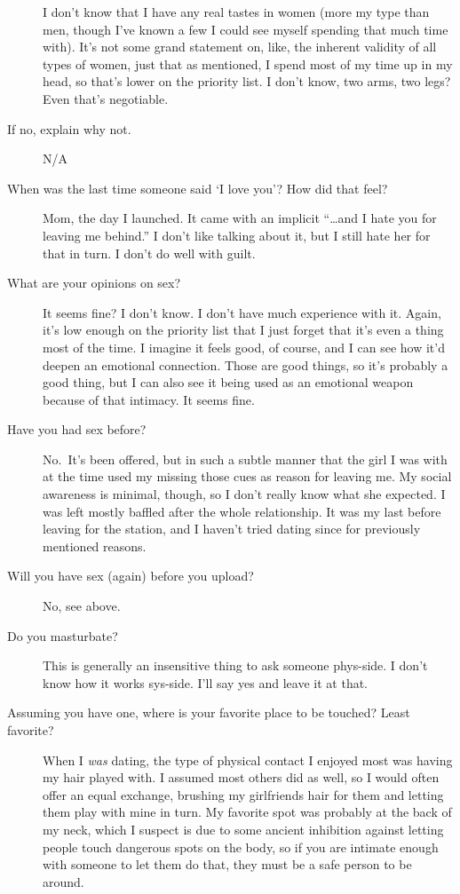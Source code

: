 \begin{description}
I don't know that I have any real tastes in women (more my type than men, though I've known a few I could see myself spending that much time with). It's not some grand statement on, like, the inherent validity of all types of women, just that as mentioned, I spend most of my time up in my head, so that's lower on the priority list. I don't know, two arms, two legs? Even that's negotiable.
\item[If no, explain why not.]
N/A
\item[When was the last time someone said `I love you'? How did that feel?]
Mom, the day I launched. It came with an implicit ``\ldots and I hate you for leaving me behind.'' I don't like talking about it, but I still hate her for that in turn. I don't do well with guilt.
\item[What are your opinions on sex?]
It seems fine? I don't know. I don't have much experience with it. Again, it's low enough on the priority list that I just forget that it's even a thing most of the time. I imagine it feels good, of course, and I can see how it'd deepen an emotional connection. Those are good things, so it's probably a good thing, but I can also see it being used as an emotional weapon because of that intimacy. It seems fine.
\item[Have you had sex before?]
No.~It's been offered, but in such a subtle manner that the girl I was with at the time used my missing those cues as reason for leaving me. My social awareness is minimal, though, so I don't really know what she expected. I was left mostly baffled after the whole relationship. It was my last before leaving for the station, and I haven't tried dating since for previously mentioned reasons.
\item[Will you have sex (again) before you upload?]
No, see above.
\item[Do you masturbate?]
This is generally an insensitive thing to ask someone phys-side. I don't know how it works sys-side. I'll say yes and leave it at that.
\item[Assuming you have one, where is your favorite place to be touched? Least favorite?]
When I \emph{was} dating, the type of physical contact I enjoyed most was having my hair played with. I assumed most others did as well, so I would often offer an equal exchange, brushing my girlfriends hair for them and letting them play with mine in turn. My favorite spot was probably at the back of my neck, which I suspect is due to some ancient inhibition against letting people touch dangerous spots on the body, so if you are intimate enough with someone to let them do that, they must be a safe person to be around.

\end{description}

